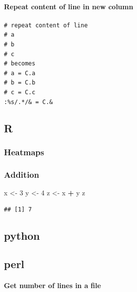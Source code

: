 \documentclass[openany]{article}
\newenvironment{Shaded}{\begin{snugshade}}{\end{snugshade}}
\newcommand{\DecValTok}[1]{\textcolor[rgb]{0.00,0.00,0.81}{#1}}
\newcommand{\NormalTok}[1]{#1}
\newcommand{\OperatorTok}[1]{\textcolor[rgb]{0.81,0.36,0.00}{\textbf{#1}}}
\newcommand{\StringTok}[1]{\textcolor[rgb]{0.31,0.60,0.02}{#1}}
\let\oldparagraph\paragraph
\renewcommand{\paragraph}[1]{\oldparagraph{#1}\mbox{}}
\begin{document}
\hypertarget{repeat-content-of-line-in-new-column}{%
\paragraph{Repeat content of line in new column}\label{repeat-content-of-line-in-new-column}}

\begin{verbatim}
# repeat content of line
# a
# b
# c
# becomes
# a = C.a
# b = C.b
# c = C.c
:%s/.*/& = C.&
\end{verbatim}

\hypertarget{r-1}{%
\subsection{R}\label{r-1}}

\hypertarget{heatmaps}{%
\subsubsection{Heatmaps}\label{heatmaps}}

\hypertarget{addition}{%
\subsubsection{Addition}\label{addition}}

\begin{Shaded}
\begin{Highlighting}[]
\NormalTok{x <-}\StringTok{ }\DecValTok{3}
\NormalTok{y <-}\StringTok{ }\DecValTok{4}
\NormalTok{z <-}\StringTok{ }\NormalTok{x }\OperatorTok{+}\StringTok{ }\NormalTok{y}
\NormalTok{z}
\end{Highlighting}
\end{Shaded}

\begin{verbatim}
## [1] 7
\end{verbatim}

\hypertarget{python}{%
\subsection{python}\label{python}}

\hypertarget{perl}{%
\subsection{perl}\label{perl}}

\hypertarget{get-number-of-lines-in-a-file}{%
\paragraph{Get number of lines in a file}\label{get-number-of-lines-in-a-file}}
\end{document}
